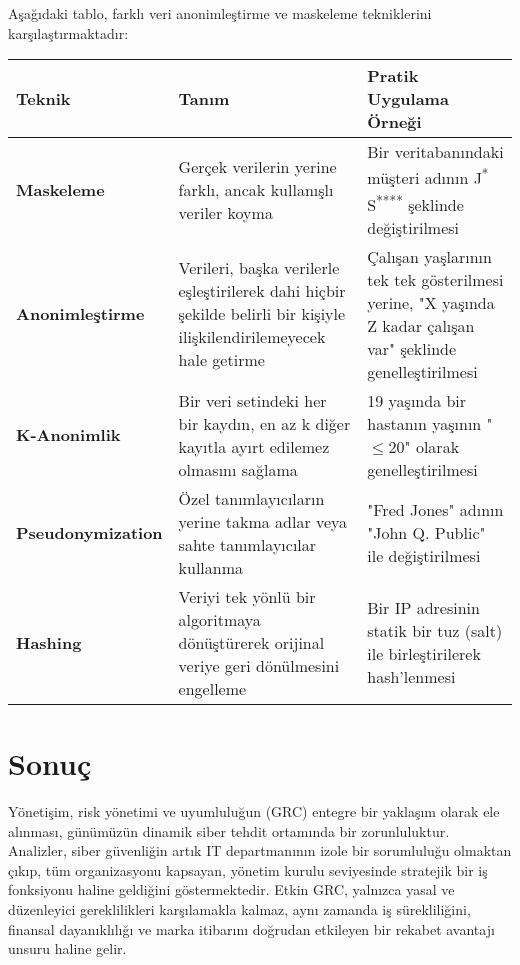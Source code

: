 Aşağıdaki tablo, farklı veri anonimleştirme ve maskeleme tekniklerini karşılaştırmaktadır:

\begin{tabular}{|l|l|l|}
\hline
Teknik & Tanım & Pratik Uygulama Örneği \\
\hline
\textbf{Maskeleme} & Gerçek verilerin yerine farklı, ancak kullanışlı veriler koyma & Bir veritabanındaki müşteri adının J\textsuperscript{*} S\textsuperscript{****} şeklinde değiştirilmesi \\
\hline
\textbf{Anonimleştirme} & Verileri, başka verilerle eşleştirilerek dahi hiçbir şekilde belirli bir kişiyle ilişkilendirilemeyecek hale getirme & Çalışan yaşlarının tek tek gösterilmesi yerine, "X yaşında Z kadar çalışan var" şeklinde genelleştirilmesi \\
\hline
\textbf{K-Anonimlik} & Bir veri setindeki her bir kaydın, en az k diğer kayıtla ayırt edilemez olmasını sağlama & 19 yaşında bir hastanın yaşının "$\le 20$" olarak genelleştirilmesi \\
\hline
\textbf{Pseudonymization} & Özel tanımlayıcıların yerine takma adlar veya sahte tanımlayıcılar kullanma & "Fred Jones" adının "John Q. Public" ile değiştirilmesi \\
\hline
\textbf{Hashing} & Veriyi tek yönlü bir algoritmaya dönüştürerek orijinal veriye geri dönülmesini engelleme & Bir IP adresinin statik bir tuz (salt) ile birleştirilerek hash'lenmesi \\
\hline
\end{tabular}

\section{Sonuç}

Yönetişim, risk yönetimi ve uyumluluğun (GRC) entegre bir yaklaşım olarak ele alınması, günümüzün dinamik siber tehdit ortamında bir zorunluluktur. Analizler, siber güvenliğin artık IT departmanının izole bir sorumluluğu olmaktan çıkıp, tüm organizasyonu kapsayan, yönetim kurulu seviyesinde stratejik bir iş fonksiyonu haline geldiğini göstermektedir. Etkin GRC, yalnızca yasal ve düzenleyici gereklilikleri karşılamakla kalmaz, aynı zamanda iş sürekliliğini, finansal dayanıklılığı ve marka itibarını doğrudan etkileyen bir rekabet avantajı unsuru haline gelir.

